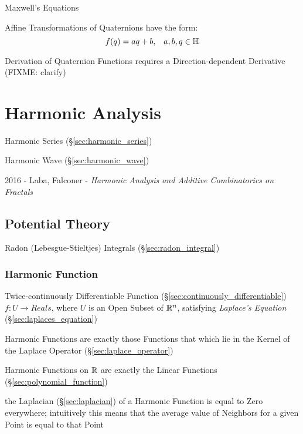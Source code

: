 Maxwell's Equations

Affine Transformations of Quaternions have the form:
\[
  f(q) = aq + b, \;\;\; a,b,q \in \mathbb{H}
\]

Derivation of Quaternion Functions requires a Direction-dependent Derivative
(FIXME: clarify)



\section{Harmonic Analysis}\label{sec:harmonic_analysis}

\fist Harmonic Series (\S\ref{sec:harmonic_series})

\fist Harmonic Wave (\S\ref{sec:harmonic_wave})

2016 - Laba, Falconer - \emph{Harmonic Analysis and Additive Combinatorics on
  Fractals}



\subsection{Potential Theory}\label{sec:potential_theory}

Radon (Lebesgue-Stieltjes) Integrals (\S\ref{sec:radon_integral})



\subsubsection{Harmonic Function}\label{sec:harmonic_function}

Twice-continuously Differentiable Function
(\S\ref{sec:continuously_differentiable}) $f : U \rightarrow Reals$,
where $U$ is an Open Subset of $\mathbb{R}^n$, satisfying \emph{Laplace's
  Equation} (\S\ref{sec:laplaces_equation})

Harmonic Functions are exactly those Functions that which lie in the Kernel of
the Laplace Operator (\S\ref{sec:laplace_operator})

Harmonic Functions on $\mathbb{R}$ are exactly the Linear Functions
(\S\ref{sec:polynomial_function})

the Laplacian (\S\ref{sec:laplacian}) of a Harmonic Function is equal to Zero
everywhere; intuitively this means that the average value of Neighbors for a
given Point is equal to that Point

